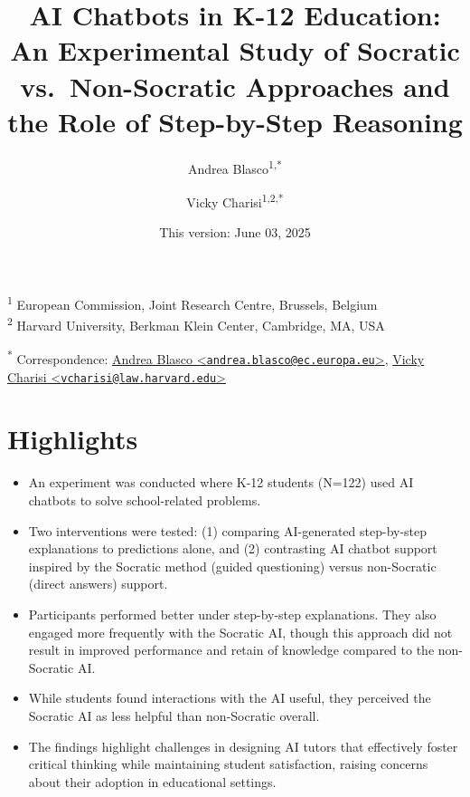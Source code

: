 \documentclass[
  12pt,
]{article}
\title{AI Chatbots in K-12 Education: An Experimental Study of Socratic vs.~Non-Socratic Approaches and the Role of Step-by-Step Reasoning}
\author{Andrea Blasco\textsuperscript{1,*} \and Vicky Charisi\textsuperscript{1,2,*}}
\date{This version: June 03, 2025}
\begin{document}
\maketitle

\textsuperscript{1} European Commission, Joint Research Centre, Brussels, Belgium\\
\textsuperscript{2} Harvard University, Berkman Klein Center, Cambridge, MA, USA

\textsuperscript{*} Correspondence: \href{mailto:andrea.blasco@ec.europa.eu}{Andrea Blasco \textless{}\href{mailto:andrea.blasco@ec.europa.eu}{\nolinkurl{andrea.blasco@ec.europa.eu}}\textgreater{}}, \href{mailto:vcharisi@law.harvard.edu}{Vicky Charisi \textless{}\href{mailto:vcharisi@law.harvard.edu}{\nolinkurl{vcharisi@law.harvard.edu}}\textgreater{}}

\section*{Highlights}\label{highlights}

\begin{itemize}
\item
  An experiment was conducted where K-12 students (N=122) used AI chatbots to solve school-related problems.
\item
  Two interventions were tested: (1) comparing AI-generated step-by-step explanations to predictions alone, and (2) contrasting AI chatbot support inspired by the Socratic method (guided questioning) versus non-Socratic (direct answers) support.
\end{itemize}

\begin{itemize}
\item
  Participants performed better under step-by-step explanations. They also engaged more frequently with the Socratic AI, though this approach did not result in improved performance and retain of knowledge compared to the non-Socratic AI.
\item
  While students found interactions with the AI useful, they perceived the Socratic AI as less helpful than non-Socratic overall.
\item
  The findings highlight challenges in designing AI tutors that effectively foster critical thinking while maintaining student satisfaction, raising concerns about their adoption in educational settings.
\end{itemize}
\end{document}
